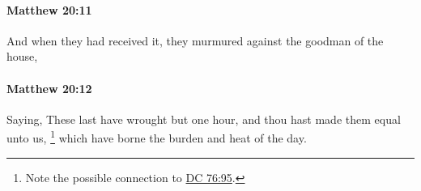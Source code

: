 		\paragraph{Matthew 20:11} %
			\label{MATTHEW-20-11}

			And when they had received it, they murmured against the goodman of the house,

			\begin{framed}
			\scriptsize
				\begin{compactdesc}
					\item[SBLG] 
				\end{compactdesc}
			\end{framed}

		\paragraph{Matthew 20:12} %
			\label{MATTHEW-20-12}

			Saying, These last have wrought but one hour, and thou hast made them equal unto us,%
				\footnote{%
					Note the possible connection to \hyperref[DC76-95]{DC 76:95}.
					}
			which have borne the burden and heat of the day.

